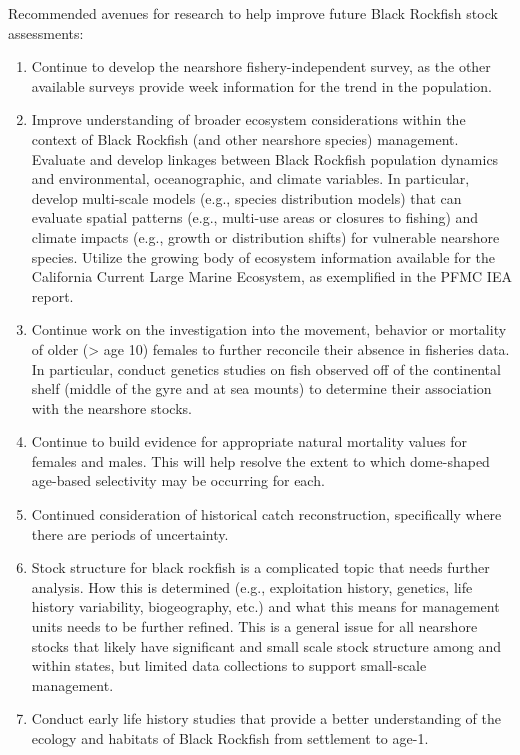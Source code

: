 \documentclass[11pt,
  english,
  letterpaper,
]{article}
\providecommand{\tightlist}{%
  \setlength{\itemsep}{0pt}\setlength{\parskip}{0pt}}
\providecommand{\tightlist}{%
  \setlength{\itemsep}{0pt}\setlength{\parskip}{0pt}}
\begin{document}
Recommended avenues for research to help improve future Black Rockfish stock assessments:

\begin{enumerate}
\def\labelenumi{\arabic{enumi}.}
\tightlist
\item
  Continue to develop the nearshore fishery-independent survey, as the other available surveys provide week information for the trend in the population.
\item
  Improve understanding of broader ecosystem considerations within the context of Black Rockfish (and other nearshore species) management. Evaluate and develop linkages between Black Rockfish population dynamics and environmental, oceanographic, and climate variables. In particular, develop multi-scale models (e.g., species distribution models) that can evaluate spatial patterns (e.g., multi-use areas or closures to fishing) and climate impacts (e.g., growth or distribution shifts) for vulnerable nearshore species. Utilize the growing body of ecosystem information available for the California Current Large Marine Ecosystem, as exemplified in the PFMC IEA report.
\item
  Continue work on the investigation into the movement, behavior or mortality of older (\textgreater{} age 10) females to further reconcile their absence in fisheries data. In particular, conduct genetics studies on fish observed off of the continental shelf (middle of the gyre and at sea mounts) to determine their association with the nearshore stocks.
\item
  Continue to build evidence for appropriate natural mortality values for females and males. This will help resolve the extent to which dome-shaped age-based selectivity may be occurring for each.
\item
  Continued consideration of historical catch reconstruction, specifically where there are periods of uncertainty.
\item
  Stock structure for black rockfish is a complicated topic that needs further analysis. How this is determined (e.g., exploitation history, genetics, life history variability, biogeography, etc.) and what this means for management units needs to be further refined. This is a general issue for all nearshore stocks that likely have significant and small scale stock structure among and within states, but limited data collections to support small-scale management.
\item
  Conduct early life history studies that provide a better understanding of the ecology and habitats of Black Rockfish from settlement to age-1.
\end{enumerate}
\end{document}
